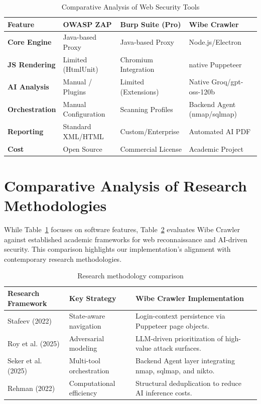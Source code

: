 \documentclass[12pt,oneside,a4paper]{book}
\begin{document}
\begin{table}[ht]
\centering
\caption{Comparative Analysis of Web Security Tools}
\label{tab:tool-comparison}
\begin{tabularx}{\textwidth}{@{} l XXX @{}}
\toprule
\textbf{Feature} & OWASP ZAP & Burp Suite (Pro) & Wibe Crawler \\
\midrule
\textbf{Core Engine} & Java-based Proxy & Java-based Proxy & Node.js/Electron \\
\textbf{JS Rendering} & Limited (HtmlUnit) & Chromium Integration & native Puppeteer \\
\textbf{AI Analysis} & Manual / Plugins & Limited (Extensions) & Native Groq/gpt-oss-120b \\
\textbf{Orchestration} & Manual Configuration & Scanning Profiles & Backend Agent (nmap/sqlmap) \\
\textbf{Reporting} & Standard XML/HTML & Custom/Enterprise & Automated AI PDF \\
\textbf{Cost} & Open Source & Commercial License & Academic Project \\
\bottomrule
\end{tabularx}
\end{table}

\section{Comparative Analysis of Research Methodologies}

While Table~\ref{tab:tool-comparison} focuses on software features, Table~\ref{tab:research-comparison} evaluates Wibe Crawler against established academic frameworks for web reconnaissance and AI-driven security. This comparison highlights our implementation's alignment with contemporary research methodologies.

\begin{table}[ht]
\centering
\caption{Research methodology comparison}
\label{tab:research-comparison}
\begin{tabularx}{\textwidth}{@{} l XXX @{}}
\toprule
\textbf{Research Framework} & \textbf{Key Strategy} & \textbf{Wibe Crawler Implementation} \\
\midrule
Stafeev (2022) \cite{stafeev2022} & State-aware navigation & Login-context persistence via Puppeteer page objects. \\
Roy et al. (2025) \cite{roy2025} & Adversarial modeling & LLM-driven prioritization of high-value attack surfaces. \\
Seker et al. (2025) \cite{seker2025} & Multi-tool orchestration & Backend Agent layer integrating nmap, sqlmap, and nikto. \\
Rehman (2022) \cite{rehman2022} & Computational efficiency & Structural deduplication to reduce AI inference costs. \\
\bottomrule
\end{tabularx}
\end{table}
\end{document}
